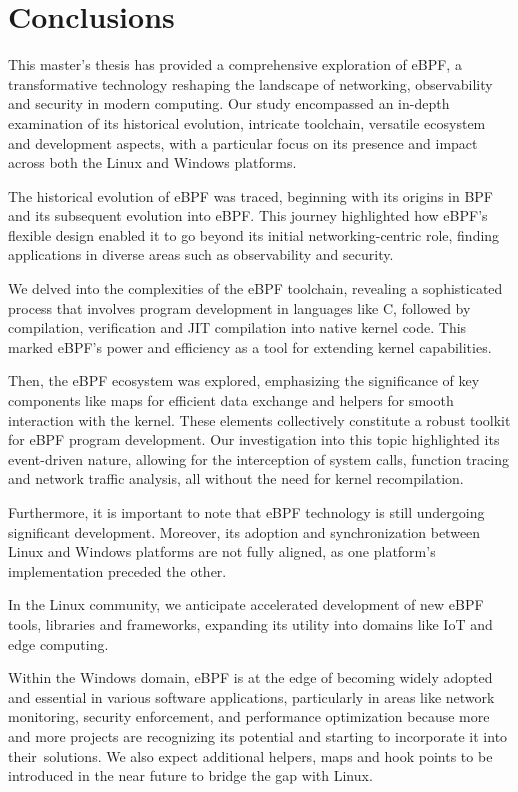 \chapter{Conclusions}

This master's thesis has provided a comprehensive exploration of eBPF, a transformative technology reshaping the landscape of networking, observability and security in modern computing. 
Our study encompassed an in-depth examination of its historical evolution, intricate toolchain, versatile ecosystem and development aspects, with a particular focus on its presence and impact across both the Linux and Windows platforms.

The historical evolution of eBPF was traced, beginning with its origins in BPF and its subsequent evolution into eBPF. 
This journey highlighted how eBPF's flexible design enabled it to go beyond its initial networking-centric role, finding applications in diverse areas such as observability and security.

We delved into the complexities of the eBPF toolchain, revealing a sophisticated process that involves program development in languages like C, followed by compilation, verification and JIT compilation into native kernel code.
This marked eBPF's power and efficiency as a tool for extending kernel capabilities.

Then, the eBPF ecosystem was explored, emphasizing the significance of key components like maps for efficient data exchange and helpers for smooth interaction with the kernel.
These elements collectively constitute a robust toolkit for eBPF program development.
Our investigation into this topic highlighted its event-driven nature, allowing for the interception of system calls, function tracing and network traffic analysis, all without the need for kernel recompilation.

Furthermore, it is important to note that eBPF technology is still undergoing significant development. 
Moreover, its adoption and synchronization between Linux and Windows platforms are not fully aligned, as one platform's implementation preceded the other.

In the Linux community, we anticipate accelerated development of new eBPF tools, libraries and frameworks, expanding its utility into domains like IoT and edge computing.

Within the Windows domain, eBPF is at the edge of becoming widely adopted and essential in various software applications, particularly in areas like network monitoring, security enforcement, and performance optimization because more and more projects are recognizing its potential and starting to incorporate it into their solutions.
We also expect additional helpers, maps and hook points to be introduced in the near future to bridge the gap with Linux.

